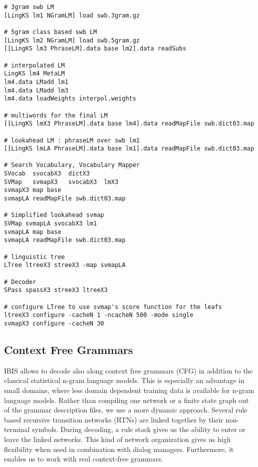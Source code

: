 \begin{verbatim}
# 3gram swb LM
[LingKS lm1 NGramLM] load swb.3gram.gz

# 5gram class based swb LM
[LingKS lm2 NGramLM] load swb.5gram.gz
[[LingKS lm3 PhraseLM].data base lm2].data readSubs

# interpolated LM
LingKS lm4 MetaLM
lm4.data LMadd lm1
lm4.data LMadd lm3
lm4.data loadWeights interpol.weights

# multiwords for the final LM
[[LingKS lmX3 PhraseLM].data base lm4].data readMapFile swb.dict03.map

# lookahead LM : phraseLM over swb lm1
[[LingKS lmLA PhraseLM].data base lm1].data readMapFile swb.dict03.map

# Search Vocabulary, Vocabulary Mapper
SVocab  svocabX3  dictX3
SVMap   svmapX3   svocabX3  lmX3
svmapX3 map base
svmapLA readMapFile swb.dict03.map

# Simplified lookahead svmap
SVMap svmapLA svocabX3 lm1
svmapLA map base
svmapLA readMapFile swb.dict03.map

# linguistic tree
LTree ltreeX3 streeX3 -map svmapLA

# Decoder
SPass spassX3 streeX3 ltreeX3

# configure LTree to use svmap's score function for the leafs
ltreeX3 configure -cacheN 1 -ncacheN 500 -mode single 
svmapX3 configure -cacheN 30
\end{verbatim}


\subsection{Context Free Grammars}

IBIS allows to decode also along context free grammars (CFG) in
addition to the classical statistical n-gram language models. This is
especially an advantage in small domains, where less domain dependent
training data is available for n-gram language models. Rather than
compiling one network or a finite state graph out of the grammar
description files, we use a more dynamic approach. Several rule based
recursive transition networks (RTNs) are linked together by their
non-terminal symbols. During decoding, a rule stack gives us the
ability to enter or leave the linked networks. This kind of network
organization gives us high flexibility when used in combination with
dialog managers. Furthermore, it enables us to work with real
context-free grammars.

